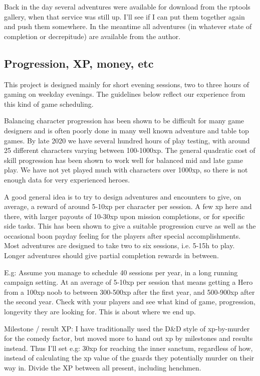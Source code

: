 Back in the day several adventures were available for download from the rptools gallery, when that service was still up. I'll see if I can put them together again and push them somewhere. In the meantime all adventures (in whatever state of completion or decrepitude) are available from the author.


\subsection*{Progression, XP, money, etc}
This project is designed mainly for short evening sessions, two to three hours of gaming on weekday evenings. The guidelines below reflect our experience from this kind of game scheduling.

Balancing character progression has been shown to be difficult for many game designers and is often poorly done in many well known adventure and table top games. By late 2020 we have several hundred hours of play testing, with around 25 different characters varying between 100-1000xp. The general quadratic cost of skill progression has been shown to work well for balanced mid and late game play. We have not yet played much with characters over 1000xp, so there is not enough data for very experienced heroes.

A good general idea is to try to design adventures and encounters to give, on average, a reward of around 5-10xp per character per session. A few xp here and there, with larger payouts of 10-30xp upon mission completions, or for specific side tasks. This has been shown to give a suitable progression curve as well as the occasional boon payday feeling for the players after special accomplishments.
Most adventures are designed to take two to six sessions, i.e. 5-15h to play. Longer adventures should give partial completion rewards in between.

E.g: Assume you manage to schedule 40 sessions per year, in a long running campaign setting. At an average of 5-10xp per session that means getting a Hero from a 100xp noob to between 300-500xp after the first year, and 500-900xp after the second year. Check with your players and see what kind of game, progression, longevity they are looking for. This is about where we end up.

Milestone / result XP:
I have traditionally used the D\&D style of xp-by-murder for the comedy factor, but moved more to hand out xp by milestones and results instead. Thus I'll set e.g: 30xp for reaching the inner sanctum, regardless of how, instead of calculating the xp value of the guards they potentially murder on their way in.
Divide the XP between all present, including henchmen.

